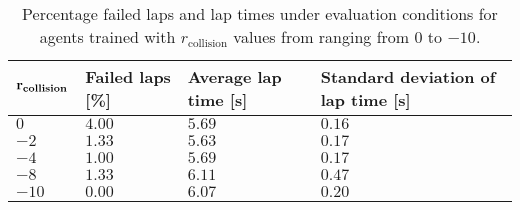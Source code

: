 \begin{table}[!htb]
\centering
\small
\begin{tabularx}{0.82\textwidth}{RLLL} 
    \hline
    $\mathbf{r}_{\text{\textbf{collision}}}$ & \textbf{Failed laps [\%]} & \textbf{Average lap time [s]} & \textbf{Standard deviation of lap time [s]}\\ 
    \hline
    $0$     & $4.00$   & $5.69$ & $0.16$ \\
    $-2$    & $1.33$   & $5.63$ & $0.17$ \\
    $-4$    & $1.00$   & $5.69$ & $0.17$ \\
    $-8$    & $1.33$   & $6.11$ & $0.47$ \\
    $-10$   & $0.00$   & $6.07$ & $0.20$ \\
    \hline
\end{tabularx}
\caption[Evaluation results of agents with different collision penalties]{Percentage failed laps and lap times under evaluation conditions for agents trained with $r_{\text{collision}}$ values from ranging from $0$ to $-10$.}
\label{tab:reward_collision}
\end{table}
